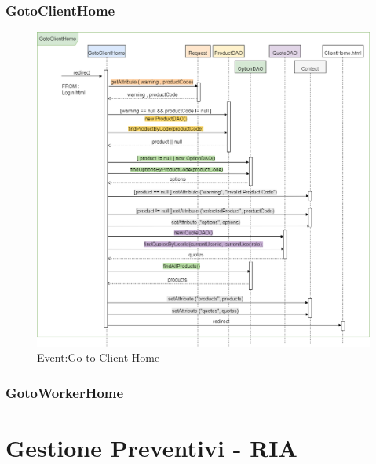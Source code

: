 \documentclass[a4paper, 12pt]{article}
\begin{document}
\subsubsection{GotoClientHome}
\begin{figure}[h!]
	\centering
	\includegraphics[width=1\textwidth]{GotoClientHome.png}
	\caption{Event:Go to Client Home}
	\label{figure:gotoclienthome_sd}
\end{figure}
\subsubsection{GotoWorkerHome}
\newpage
\section{Gestione Preventivi - RIA}
\end{document}
